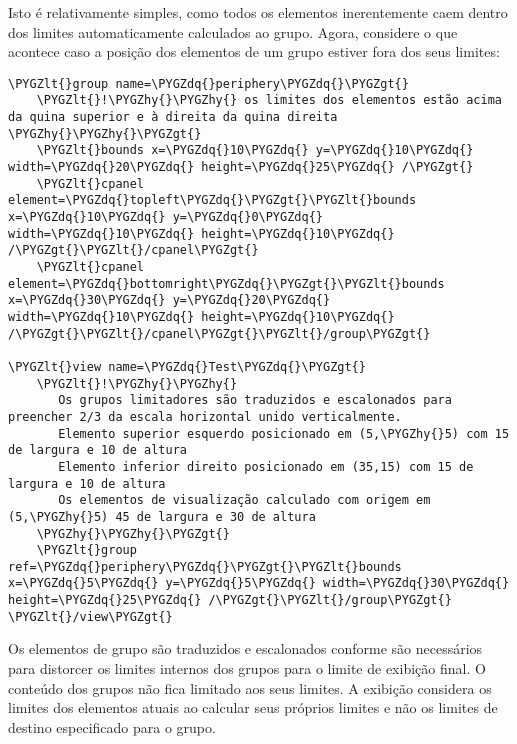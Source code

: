 \documentclass[letterpaper,10pt,brazil]{sphinxmanual}
\def\PYGZlt{\char`\<}
\def\PYGZgt{\char`\>}
\def\PYGZhy{\char`\-}
\def\PYGZdq{\char`\"}
\begin{document}
Isto é relativamente simples, como todos os elementos inerentemente caem
dentro dos limites automaticamente calculados ao grupo. Agora, considere
o que acontece caso a posição dos elementos de um grupo estiver fora dos
seus limites:

\begin{Verbatim}[commandchars=\\\{\}]
\PYGZlt{}group name=\PYGZdq{}periphery\PYGZdq{}\PYGZgt{}
    \PYGZlt{}!\PYGZhy{}\PYGZhy{} os limites dos elementos estão acima da quina superior e à direita da quina direita \PYGZhy{}\PYGZhy{}\PYGZgt{}
    \PYGZlt{}bounds x=\PYGZdq{}10\PYGZdq{} y=\PYGZdq{}10\PYGZdq{} width=\PYGZdq{}20\PYGZdq{} height=\PYGZdq{}25\PYGZdq{} /\PYGZgt{}
    \PYGZlt{}cpanel element=\PYGZdq{}topleft\PYGZdq{}\PYGZgt{}\PYGZlt{}bounds x=\PYGZdq{}10\PYGZdq{} y=\PYGZdq{}0\PYGZdq{} width=\PYGZdq{}10\PYGZdq{} height=\PYGZdq{}10\PYGZdq{} /\PYGZgt{}\PYGZlt{}/cpanel\PYGZgt{}
    \PYGZlt{}cpanel element=\PYGZdq{}bottomright\PYGZdq{}\PYGZgt{}\PYGZlt{}bounds x=\PYGZdq{}30\PYGZdq{} y=\PYGZdq{}20\PYGZdq{} width=\PYGZdq{}10\PYGZdq{} height=\PYGZdq{}10\PYGZdq{} /\PYGZgt{}\PYGZlt{}/cpanel\PYGZgt{}\PYGZlt{}/group\PYGZgt{}

\PYGZlt{}view name=\PYGZdq{}Test\PYGZdq{}\PYGZgt{}
    \PYGZlt{}!\PYGZhy{}\PYGZhy{}
       Os grupos limitadores são traduzidos e escalonados para preencher 2/3 da escala horizontal unido verticalmente.
       Elemento superior esquerdo posicionado em (5,\PYGZhy{}5) com 15 de largura e 10 de altura
       Elemento inferior direito posicionado em (35,15) com 15 de largura e 10 de altura
       Os elementos de visualização calculado com origem em (5,\PYGZhy{}5) 45 de largura e 30 de altura
    \PYGZhy{}\PYGZhy{}\PYGZgt{}
    \PYGZlt{}group ref=\PYGZdq{}periphery\PYGZdq{}\PYGZgt{}\PYGZlt{}bounds x=\PYGZdq{}5\PYGZdq{} y=\PYGZdq{}5\PYGZdq{} width=\PYGZdq{}30\PYGZdq{} height=\PYGZdq{}25\PYGZdq{} /\PYGZgt{}\PYGZlt{}/group\PYGZgt{}
\PYGZlt{}/view\PYGZgt{}
\end{Verbatim}

Os elementos de grupo são traduzidos e escalonados conforme são
necessários para distorcer os limites internos dos grupos para o limite
de exibição final. O conteúdo dos grupos não fica limitado aos seus
limites. A exibição considera os limites dos elementos atuais ao
calcular seus próprios limites e não os limites de destino especificado
para o grupo.
\end{document}
